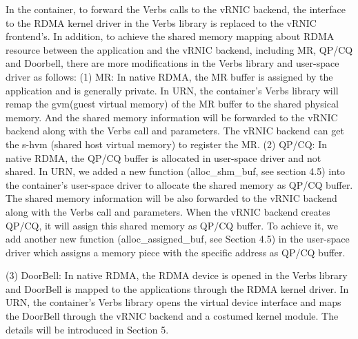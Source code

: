 In the container, to forward the Verbs calls to the vRNIC backend, the interface to the RDMA kernel driver in the Verbs library is replaced to the vRNIC frontend's. In addition, to achieve the shared memory mapping about RDMA resource  between the application and the vRNIC backend, including MR, QP/CQ and Doorbell, there are more modifications in the Verbs library and user-space driver as follows:
(1) MR: In native RDMA, the MR buffer is assigned by the application and is generally private. In URN, the container's Verbs library will remap the gvm(guest virtual memory) of the MR buffer to the shared physical memory. And the shared memory information will be forwarded to the vRNIC backend along with the Verbs call and parameters. The vRNIC backend can get the s-hvm (shared host virtual memory) to register the MR.
(2) QP/CQ: In native RDMA, the QP/CQ buffer is allocated in user-space driver and not shared. In URN, we added a new function (alloc\_shm\_buf, see section 4.5) into the container's user-space driver to allocate the shared memory as QP/CQ buffer. The shared memory information will be also forwarded to the vRNIC backend along with the Verbs call and parameters. When the vRNIC backend creates QP/CQ, it will assign this shared memory as QP/CQ buffer. To achieve it, we add another new function (alloc\_assigned\_buf, see Section 4.5) in the user-space driver which assigns a memory piece with the specific address as QP/CQ buffer.

(3) DoorBell: In native RDMA, the RDMA device is opened in the Verbs library and DoorBell is mapped to the applications through the RDMA kernel driver. In URN, the container's Verbs library opens the virtual device interface and maps the DoorBell through the vRNIC backend and a costumed kernel module. The details will be introduced in Section 5.


